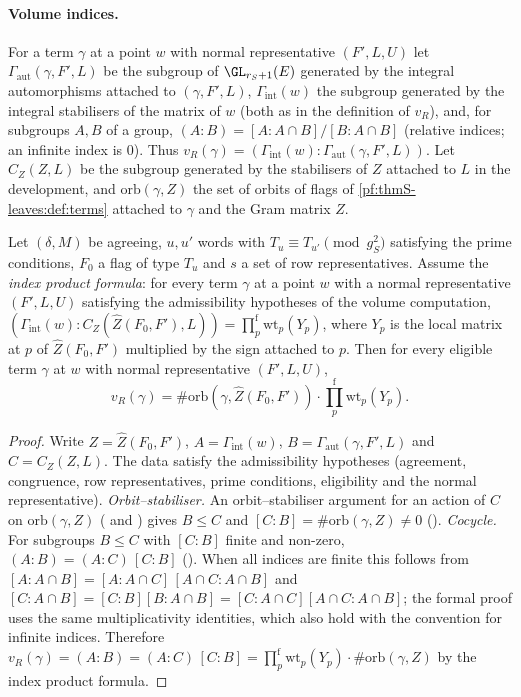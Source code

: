 \paragraph{Volume indices.} For a term $\gamma$ at a point $w$ with normal representative $(F',L,U)$ let $\Gamma_{\mathrm{aut}}(\gamma,F',L)$ be the
subgroup of $\GL_{r_S+1}(E)$ generated by the integral automorphisms attached to $(\gamma,F',L)$, $\Gamma_{\mathrm{int}}(w)$ the subgroup
generated by the integral stabilisers of the matrix of $w$ (both as in the definition of $v_R$), and, for subgroups $A,B$ of a group,
$(A:B)=[A:A\cap B]/[B:A\cap B]$ (relative indices; an infinite index is $0$). Thus $v_R(\gamma)=(\Gamma_{\mathrm{int}}(w):\Gamma_{\mathrm{aut}}(\gamma,F',L))$. Let
$C_Z(Z,L)$ be the subgroup generated by the stabilisers of $Z$ attached to $L$ in the development, and $\mathrm{orb}(\gamma,Z)$ the set of
orbits of flags of \cref{pf:thmS-leaves:def:terms} attached to $\gamma$ and the Gram matrix $Z$.

\begin{proposition}\label{pf:thmS-leaves:prop:volidx}
Let $(\delta,M)$ be agreeing, $u,u'$ words with $T_u\equiv T_{u'}\pmod{g_S^2}$ satisfying the prime conditions, $F_0$ a flag of type $T_u$
and $s$ a set of row representatives. Assume the \emph{index product formula}: for every term $\gamma$ at a point $w$ with a normal
representative $(F',L,U)$ satisfying the admissibility hypotheses of the volume computation,
$(\Gamma_{\mathrm{int}}(w):C_Z(\widehat Z(F_0,F'),L))=\prod^{\mathrm f}_p\mathrm{wt}_p(Y_p)$, where $Y_p$ is the local matrix at $p$ of
$\widehat Z(F_0,F')$ multiplied by the sign attached to $p$. Then for every eligible term $\gamma$ at $w$ with normal representative $(F',L,U)$,
\[
v_R(\gamma)=\#\mathrm{orb}(\gamma,\widehat Z(F_0,F'))\cdot\prod^{\mathrm f}_p\mathrm{wt}_p(Y_p).
\]
\end{proposition}

\begin{proof}
Write $Z=\widehat Z(F_0,F')$, $A=\Gamma_{\mathrm{int}}(w)$, $B=\Gamma_{\mathrm{aut}}(\gamma,F',L)$ and $C=C_Z(Z,L)$. The data satisfy the admissibility hypotheses
(agreement, congruence, row representatives, prime conditions, eligibility and the normal representative).
\emph{Orbit--stabiliser.} An orbit--stabiliser argument for an action of $C$ on $\mathrm{orb}(\gamma,Z)$
( and ) gives $B\le C$ and
$[C:B]=\#\mathrm{orb}(\gamma,Z)\ne0$ ().
\emph{Cocycle.} For subgroups $B\le C$ with $[C:B]$ finite and non-zero, $(A:B)=(A:C)\,[C:B]$
(). When all indices are finite this follows from
$[A:A\cap B]=[A:A\cap C]\,[A\cap C:A\cap B]$ and $[C:A\cap B]=[C:B][B:A\cap B]=[C:A\cap C][A\cap C:A\cap B]$; the formal proof uses the same
multiplicativity identities, which also hold with the convention for infinite indices. Therefore
$v_R(\gamma)=(A:B)=(A:C)\,[C:B]=\prod^{\mathrm f}_p\mathrm{wt}_p(Y_p)\cdot\#\mathrm{orb}(\gamma,Z)$ by the index product formula.
\end{proof}
